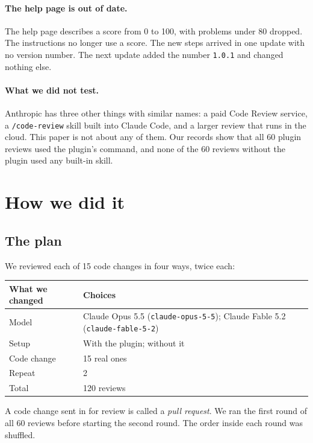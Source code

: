 \documentclass[11pt]{article}
\begin{document}
\paragraph{The help page is out of date.} The help page describes a score from 0 to 100, with problems under 80 dropped. The instructions no longer use a score. The new steps arrived in one update with no version number. The next update added the number \texttt{1.0.1} and changed nothing else.

\paragraph{What we did not test.} Anthropic has three other things with similar names: a paid Code Review service, a \texttt{/code-review} skill built into Claude Code, and a larger review that runs in the cloud. This paper is not about any of them. Our records show that all 60 plugin reviews used the plugin's command, and none of the 60 reviews without the plugin used any built-in skill.

\section{How we did it}

\subsection{The plan}

We reviewed each of 15 code changes in four ways, twice each:

\begin{center}
\begin{tabular}{ll}
\toprule
What we changed & Choices \\
\midrule
Model & Claude Opus 5.5 (\texttt{claude-opus-5-5}); Claude Fable 5.2 (\texttt{claude-fable-5-2}) \\
Setup & With the plugin; without it \\
Code change & 15 real ones \\
Repeat & 2 \\
\midrule
Total & 120 reviews \\
\bottomrule
\end{tabular}
\end{center}

A code change sent in for review is called a \emph{pull request}. We ran the first round of all 60 reviews before starting the second round. The order inside each round was shuffled.
\end{document}
